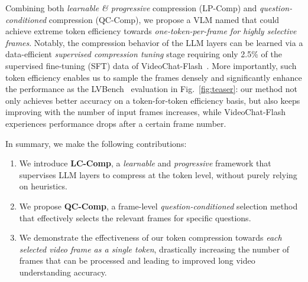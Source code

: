 Combining both \emph{learnable \& progressive} compression (LP-Comp) and \emph{question-conditioned} compression (QC-Comp), we propose a VLM named \textbf{\name} that could achieve extreme token efficiency towards \emph{one-token-per-frame for highly selective frames}. Notably, the compression behavior of the LLM layers can be learned via a data-efficient \emph{supervised compression tuning} stage requiring only 2.5\% of the supervised fine-tuning (SFT) data of VideoChat-Flash~\cite{li2024videochat}. More importantly, such token efficiency enables us to sample the frames densely and significantly enhance the performance as the LVBench~\cite{wang2024lvbench} evaluation in Fig.~\ref{fig:teaser}: our method not only achieves better accuracy on a token-for-token efficiency basis, but also keeps improving with the number of input frames increases, while VideoChat-Flash experiences performance drops after a certain frame number.


In summary, we make the following contributions:

\begin{enumerate}[leftmargin=*, noitemsep, nolistsep]

\item We introduce \textbf{LC-Comp}, a \emph{learnable} and \emph{progressive} framework that supervises LLM layers to compress at the token level, without purely relying on heuristics.

\item We propose \textbf{QC-Comp}, a frame-level \emph{question-conditioned} selection method that effectively selects the relevant frames for specific questions.

\item We demonstrate the effectiveness of our token compression towards \emph{each selected video frame as a single token}, drastically increasing the number of frames that can be processed and leading to improved long video understanding accuracy.
\end{enumerate}

